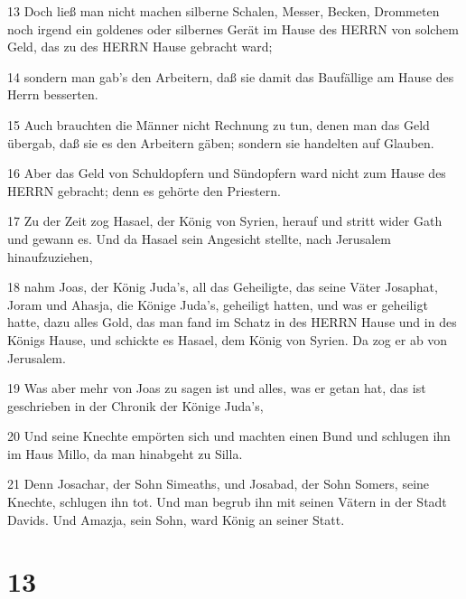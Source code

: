 \par 13 Doch ließ man nicht machen silberne Schalen, Messer, Becken, Drommeten noch irgend ein goldenes oder silbernes Gerät im Hause des HERRN von solchem Geld, das zu des HERRN Hause gebracht ward;
\par 14 sondern man gab's den Arbeitern, daß sie damit das Baufällige am Hause des Herrn besserten.
\par 15 Auch brauchten die Männer nicht Rechnung zu tun, denen man das Geld übergab, daß sie es den Arbeitern gäben; sondern sie handelten auf Glauben.
\par 16 Aber das Geld von Schuldopfern und Sündopfern ward nicht zum Hause des HERRN gebracht; denn es gehörte den Priestern.
\par 17 Zu der Zeit zog Hasael, der König von Syrien, herauf und stritt wider Gath und gewann es. Und da Hasael sein Angesicht stellte, nach Jerusalem hinaufzuziehen,
\par 18 nahm Joas, der König Juda's, all das Geheiligte, das seine Väter Josaphat, Joram und Ahasja, die Könige Juda's, geheiligt hatten, und was er geheiligt hatte, dazu alles Gold, das man fand im Schatz in des HERRN Hause und in des Königs Hause, und schickte es Hasael, dem König von Syrien. Da zog er ab von Jerusalem.
\par 19 Was aber mehr von Joas zu sagen ist und alles, was er getan hat, das ist geschrieben in der Chronik der Könige Juda's,
\par 20 Und seine Knechte empörten sich und machten einen Bund und schlugen ihn im Haus Millo, da man hinabgeht zu Silla.
\par 21 Denn Josachar, der Sohn Simeaths, und Josabad, der Sohn Somers, seine Knechte, schlugen ihn tot. Und man begrub ihn mit seinen Vätern in der Stadt Davids. Und Amazja, sein Sohn, ward König an seiner Statt.

\chapter{13}

